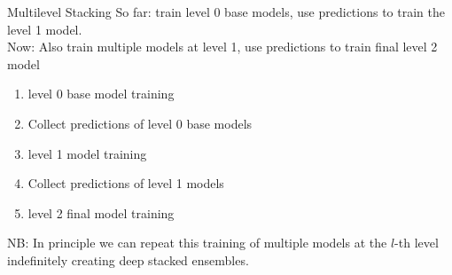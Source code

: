 \documentclass[11pt,compress,t,notes=noshow, xcolor=table]{beamer}
\begin{document}
\begin{vbframe}{Multilevel Stacking}
\vfill
So far: train level 0 base models, use predictions to train the level 1 model.\\
Now: Also train multiple models at level 1, use predictions to train final level 2 model 
\vfill
\begin{enumerate}
    \item level 0 base model training
    \item Collect predictions of level 0 base models
    \item level 1 model training 
    \item Collect predictions of level 1 models
    \item level 2 final model training
\end{enumerate}
\vfill
NB: In principle we can repeat this training of multiple models at the $l$-th level indefinitely creating deep stacked ensembles.
\vfill
\end{vbframe}

\end{document}
